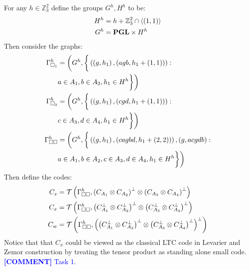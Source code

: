 \documentclass{article}
\newcommand{\commentt}[1]{\textcolor{blue}{ \textbf{[COMMENT]} #1}}
\newcommand{\ctt}[1]{\commentt{#1}}
\begin{document}
\begin{multicols*}{2}
  For any $h \in \mathbb{Z}_{3}^{2} $ define the groups $G^{h}, H^{h}$ to be: 
  \begin{equation*}
    \begin{split}
      H^{h} &=  h + \mathbb{Z}_{3}^{2}\cap \braket{ \left( 1,1 \right)} \\
      G^{h} &=  \mathbf{PGL}  \times H^{h} 
    	\end{split}
\end{equation*} 
  Then consider the graphs:   
  \begin{equation*}
    \begin{split}
      \Gamma_{\square_{1}}^{h} &= \bigg( G^{h}, \bigg{\{} \left( \left(g, h_{1} \right),\left(  agb,h_{1} + \left( 1,1 \right)  \right)\right) :  \\ 
      &  a \in A_{1}, b \in A_{2}, h_{1} \in H^{h}  \bigg{\}}  \bigg) \\
      \Gamma_{\square_{2}}^{h} &= \bigg( G^{h}, \bigg{\{} \left( \left(g, h_{1} \right),\left(  cgd,h_{1} + \left( 1,1 \right)  \right)\right) :  \\ 
      &  c \in A_{3}, d \in A_{4}, h_{1} \in H^{h}  \bigg{\}}  \bigg) \\
      \Gamma_{\square \square}^{h} &= \bigg( G^{h}, \bigg{\{} \left(\left(g, h_{1} \right),\left(  cagbd, h_{1} + \left( 2,2 \right)  \right)\right), \left( g, acgdb \right) :\\
      & a \in A_{1}, b \in A_{2}, c \in A_{3}, d \in A_{4}, h_{1}\in H^{h} \bigg{\}}  \bigg) 
    \end{split}
  \end{equation*}
   Then define the codes:
	\begin{equation*}
	  \begin{split}
	    C_{z} & = \mathcal{T}\left( \Gamma_{\square \square }^{h},  \left( C_{A_{1}} \otimes C_{A_{2}} \right)^{\perp} \otimes \left( C_{A_{3}} \otimes C_{A_{4}} \right)^{\perp }  \right) \\
	    C_{x} &=  \mathcal{T}\left(  \Gamma_{\square \square }^{h}, \left( C_{A_{1}}^{\perp} \otimes C_{A_{2}}^{\perp} \right)^\perp \otimes \left( C_{A_{3}}^{\perp} \otimes C_{A_{4}}^{\perp} \right)^\perp  \right) \\
	    C_{w} &=  \mathcal{T}\left( \Gamma_{\square \square }^{h} , \left(\left( C_{A_{1}}^{\perp} \otimes C_{A_{2}}^{\perp} \right)^\perp \otimes \left( C_{A_{3}}^{\perp} \otimes C_{A_{4}}^{\perp} \right)^\perp\right)^{\perp} \right)   
	  \end{split}
	\end{equation*}
	Notice that that $C_{x}$ could be viewed as the classical LTC code in Levarier and Zemor construction by treating the tensor product as standing alone small code. \ctt{ Task 1. }  


\end{multicols*}
\end{document}
